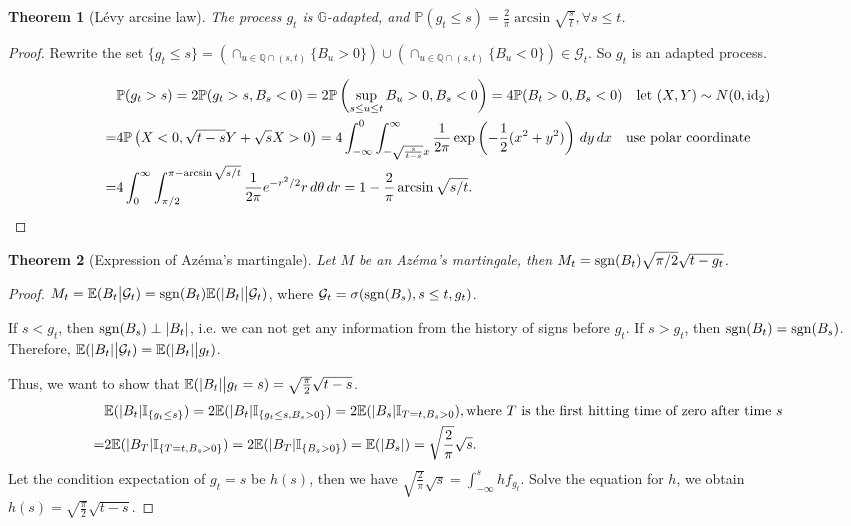 \documentclass[openany,oneside]{book}
\newtheorem{thm}{Theorem}[section]
\theoremstyle{definition}
\theoremstyle{remark}
\newcommand{\E}{\mathbb{E}} %
\renewcommand{\P}{\mathbb{P}} %
\newcommand{\I}{\mathbb{I}} %
\DeclarePairedDelimiter{\abs}{\lvert}{\rvert} %
\begin{document}
\begin{thm}[L\'evy arcsine law]
The process $g_t$ is $\mathbb{G}$-adapted, and $\P(g_t \le s) = \frac{2}{\pi} \arcsin \sqrt{\frac{s}{t}}, \forall s\le t$.
\end{thm}
\begin{proof}
Rewrite the set $\{g_t \le s\} = \left(\cap_{u\in \mathbb{Q} \cap (s,t)} \{B_u > 0\}\right) \cup \left(\cap_{u\in \mathbb{Q} \cap (s,t)} \{B_u < 0\}\right) \in \mathcal{G}_t$. So $g_t$ is an adapted process.
\par
\begin{align*}
& \P(g_t > s) = 2\P(g_t > s, B_s < 0) = 2\P\left(\sup_{s\le u\le t}B_u > 0, B_s < 0\right) = 4\P(B_t > 0, B_s < 0) \quad \textrm{let }(X,Y) \sim N(0,\rm{id}_2) \\
=& 4\P\left(X<0, \sqrt{t-s}Y+\sqrt{s}X > 0\right) = 4 \int_{-\infty}^0 \int_{-\sqrt{\frac{s}{t-s}}x}^\infty \frac{1}{2\pi}\exp\left(-\frac{1}{2}(x^2 + y^2)\right) \,d y \,d x \quad \textrm{use polar coordinate} \\
=& 4 \int_0^\infty \int_{\pi/2}^{\pi-\arcsin\sqrt{s/t}} \frac{1}{2\pi} e^{-r^2/2} r \,d \theta \,d r = 1-\frac{2}{\pi} \arcsin \sqrt{s/t}.
\end{align*}
\end{proof}


\begin{thm}[Expression of Az\'ema's martingale]
Let $M$ be an Az\'ema's martingale, then $M_t = {\rm sgn}(B_t) \sqrt{\pi/2}\sqrt{t-g_t}$.
\end{thm}
\begin{proof}
$M_t = \E(B_t \big| \mathcal{G}_t) = {\rm sgn}(B_t) \E(\abs{B_t} \big| \mathcal{G}_t)$, where $\mathcal{G}_t = \sigma({\rm sgn}(B_s), s\le t, g_t)$.
\par
If $s< g_t$, then ${\rm sgn}(B_s) \perp \abs{B_t}$, i.e. we can not get any information from the history of signs before $g_t$. If $s> g_t$, then ${\rm sgn}(B_t) = {\rm sgn}(B_s)$. Therefore, $\E(\abs{B_t} \big| \mathcal{G}_t) = \E(\abs{B_t} \big| g_t)$.
\par
Thus, we want to show that $\E(\abs{B_t} \big| g_t =s) = \sqrt{\frac{\pi}{2}}\sqrt{t-s}$.
\begin{align*}
& \E(\abs{B_t} \I_{\{g_t \le s\}}) = 2\E(\abs{B_t} \I_{\{g_t \le s, B_s >0\}}) = 2\E(\abs{B_s}\I_{T=t, B_s>0}), \textrm{where $T$ is the first hitting time of zero after time $s$} \\
=& 2\E(\abs{B_T} \I_{\{T=t, B_s>0\}}) = 2\E(\abs{B_T} \I_{\{B_s>0\}}) = \E(\abs{B_s}) = \sqrt{\frac{2}{\pi}} \sqrt{s}.
\end{align*}
Let the condition expectation of $g_t =s$ be $h(s)$, then we have $\sqrt{\frac{2}{\pi}}\sqrt{s} = \int_{-\infty}^s h f_{g_t}$. Solve the equation for $h$, we obtain $h(s) = \sqrt{\frac{\pi}{2}}\sqrt{t-s}$.
\end{proof}
\end{document}
